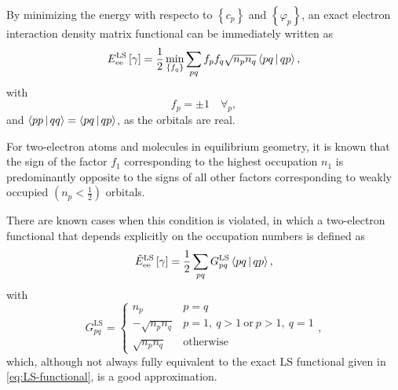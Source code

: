 \begin{enumerate}
        By minimizing the energy with respecto to $\left\{ c_p \right\}$ and
        $\left\{ \varphi_p \right\}$, an exact electron interaction density
        matrix functional can be immediately written as 
        \begin{equation} \label{eq:LS-functional}
            E_{\text{ee}}^{\text{LS}} \left[ \fordm \right] =
            \frac{1}{2} \min_{ \left\{ f_q \right\}} \sum_{pq}
            f_p f_q \sqrt{n_p n_q} \Braket{pq | qp}
            ,
        \end{equation}
        with 
        \begin{equation}
            f_p = \pm 1\quad \forall_p
            ,
        \end{equation}
        and $ \Braket{pp | qq} = \Braket{pq | qp}$, as the orbitals are real.

        For two-electron atoms and molecules in equilibrium geometry, it is 
        known that the sign of the factor $f_1$ corresponding to the highest 
        occupation $n_1$ is predominantly opposite to the signs of all other 
        factors corresponding to weakly occupied $\left( n_p < \frac{1}{2} \right)$
        orbitals.

        There are known cases when this condition is violated, in which a two-electron functional that depends 
        explicitly on the occupation numbers is defined as
        \begin{equation} \label{eq:Eee-LS-functional}
            \tilde{E}_{\text{ee}}^{\text{LS}} \left[ \fordm \right] =
            \frac{1}{2} \sum_{pq}  G_{pq}^{\text{LS}} \Braket{pq | qp},
        \end{equation}
        with 
        \begin{equation} \label{eq:GLS}
            G_{pq}^{\text{LS}} =
            \begin{cases}
                n_p & p = q \\
                - \sqrt{n_p n_q} & p = 1,\ q > 1\ \mathrm{or}\ p>1,\ q=1 \\
                \sqrt{n_p n_q} & \text{otherwise}
            \end{cases}
            ,
        \end{equation}
        which, although not always fully equivalent to the exact LS functional
        given in \cref{eq:LS-functional}, is a good approximation.


\end{enumerate}
